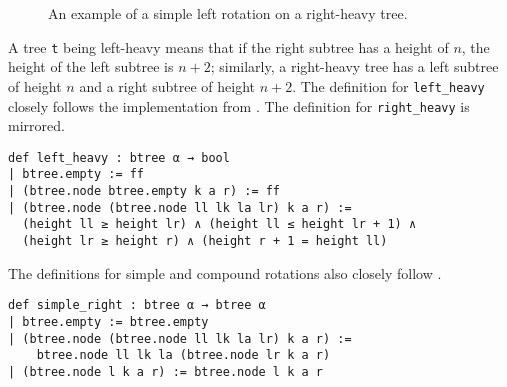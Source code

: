 \begin{figure}[!ht]
  \begin{subfigure}{0.5\textwidth}
    \centering
  \end{subfigure}%
  \begin{subfigure}{0.5\textwidth}
    \centering
  \end{subfigure}
  \label{fig:rotation}
  \caption{An example of a simple left rotation on a right-heavy tree.}
\end{figure}

A tree \lstinline{t} being left-heavy means that if the right subtree has a height of $n$, the height of the left subtree is $n+2$; similarly, a right-heavy tree has a left subtree of height $n$ and a right subtree of height $n+2$. The definition for \lstinline{left_heavy} closely follows the implementation from \cite{textbook:discrete_computer}. The definition for \lstinline{right_heavy} is mirrored.

\begin{lstlisting}[caption=\empty]
def left_heavy : btree α → bool
| btree.empty := ff
| (btree.node btree.empty k a r) := ff
| (btree.node (btree.node ll lk la lr) k a r) :=
  (height ll ≥ height lr) ∧ (height ll ≤ height lr + 1) ∧
  (height lr ≥ height r) ∧ (height r + 1 = height ll)
\end{lstlisting}

The definitions for simple and compound rotations also closely follow \cite{textbook:discrete_computer}. 

\begin{lstlisting}[caption=\empty, label={lst:def_simple_right}]
def simple_right : btree α → btree α
| btree.empty := btree.empty
| (btree.node (btree.node ll lk la lr) k a r) := 
    btree.node ll lk la (btree.node lr k a r)
| (btree.node l k a r) := btree.node l k a r
\end{lstlisting}

